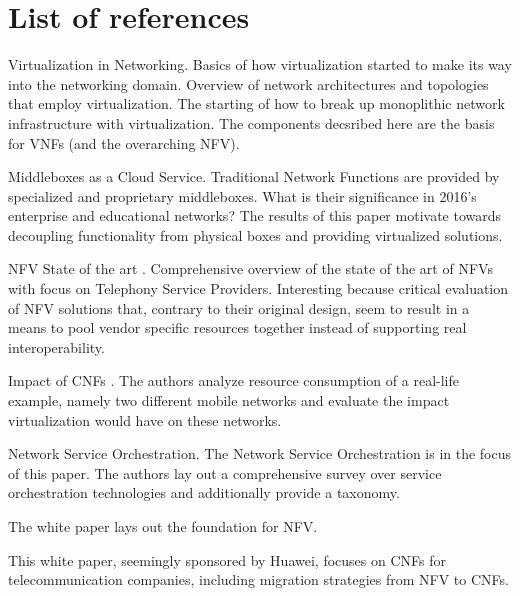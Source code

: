 \section{List of references}
\begin{description}[style=sameline, leftmargin=1em, font=\normalfont]
	\item[Pfaff \cite{pfaff2009extending}]  Virtualization in Networking. Basics of how virtualization started to make its way into the networking domain. Overview of network architectures and topologies that employ virtualization. The starting of how to break up monoplithic network infrastructure with virtualization. The components decsribed here are the basis for VNFs (and the overarching NFV). 
	
	\item[Sherry \cite{sherry2016middleboxes}] Middleboxes as a Cloud Service. Traditional Network Functions are provided by specialized and proprietary middleboxes. What is their significance in 2016's enterprise and educational networks? The results of this paper motivate towards decoupling functionality from physical boxes and providing virtualized solutions.
	
	\item [Mijumbi \cite{mijumbi2016network}] NFV State of the art . Comprehensive overview of the state of the art of NFVs with focus on Telephony Service Providers. Interesting because critical evaluation of NFV solutions that, contrary to their original design, seem to result in a means to pool vendor specific resources together instead of supporting real interoperability. 
	
	\item [Bilal \cite{bilal2016impact}] Impact of CNFs . The authors analyze resource consumption of a real-life example, namely two different mobile networks and evaluate the impact virtualization would have on these networks. 
	
	\item [De Sousa \cite{de2018network}] Network Service Orchestration. The Network Service Orchestration is in the focus of this paper. The authors lay out a comprehensive survey over service orchestration technologies and additionally provide a taxonomy.  
	
	\item[NFV White Paper \cite{nfv_wp}]  The white paper lays out the foundation for NFV. 
	
	\item [AM White Paper \cite{evolutionnfv}] This white paper, seemingly sponsored by  Huawei, focuses on CNFs for telecommunication companies, including migration strategies from NFV to CNFs. 
	

\end{description}
